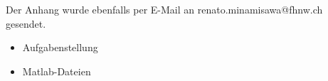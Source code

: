 Der Anhang wurde ebenfalls per E-Mail an renato.minamisawa@fhnw.ch gesendet.

\begin{itemize}
\item Aufgabenstellung
\item Matlab-Dateien
\end{itemize}